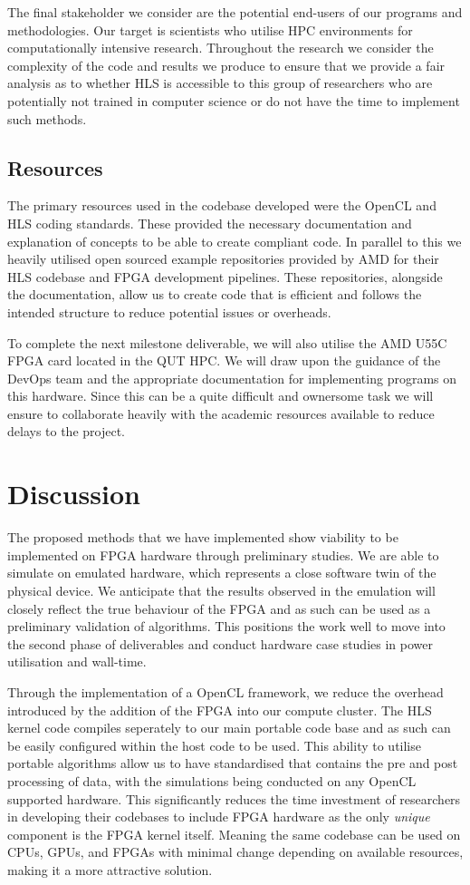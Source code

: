 \documentclass[11pt, a4paper]{article}
\begin{document}
	The final stakeholder we consider are the potential end-users of our programs and methodologies. Our target is scientists who utilise HPC environments for computationally intensive research. Throughout the research we consider the complexity of the code and results we produce to ensure that we provide a fair analysis as to whether HLS is accessible to this group of researchers who are potentially not trained in computer science or do not have the time to implement such methods. 
	
	\subsection{Resources}
	The primary resources used in the codebase developed were the OpenCL and HLS coding standards. These provided the necessary documentation and explanation of concepts to be able to create compliant code. In parallel to this we heavily utilised open sourced example repositories provided by AMD for their HLS codebase and FPGA development pipelines. These repositories, alongside the documentation, allow us to create code that is efficient and follows the intended structure to reduce potential issues or overheads.
	
	To complete the next milestone deliverable, we will also utilise the AMD U55C FPGA card located in the QUT HPC. We will draw upon the guidance of the DevOps team and the appropriate documentation for implementing programs on this hardware. Since this can be a quite difficult and ownersome task we will ensure to collaborate heavily with the academic resources available to reduce delays to the project. 
	
	\section{Discussion}
	The proposed methods that we have implemented show viability to be implemented on FPGA hardware through preliminary studies. We are able to simulate on emulated hardware, which represents a close software twin of the physical device. We anticipate that the results observed in the emulation will closely reflect the true behaviour of the FPGA and as such can be used as a preliminary validation of algorithms. This positions the work well to move into the second phase of deliverables and conduct hardware case studies in power utilisation and wall-time. 
	
	Through the implementation of a OpenCL framework, we reduce the overhead introduced by the addition of the FPGA into our compute cluster. The HLS kernel code compiles seperately to our main portable code base and as such can be easily configured within the host code to be used. This ability to utilise portable algorithms allow us to have standardised that contains the pre and post processing of data, with the simulations being conducted on any OpenCL supported hardware. This significantly reduces the time investment of researchers in developing their codebases to include FPGA hardware as the only \textit{unique} component is the FPGA kernel itself. Meaning the same codebase can be used on CPUs, GPUs, and FPGAs with minimal change depending on available resources, making it a more attractive solution. 
	
\end{document}
